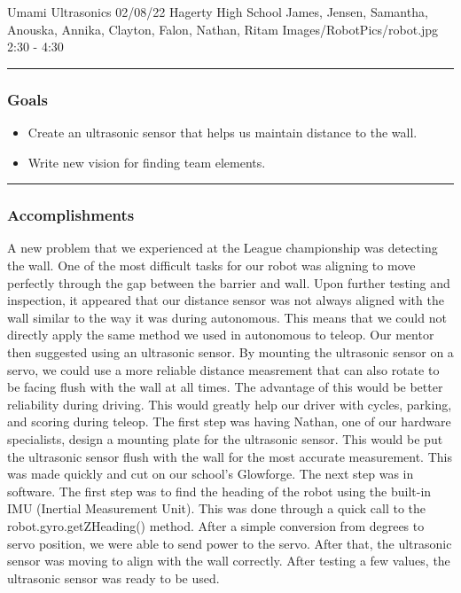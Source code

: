 \insertmeeting 
	{Umami Ultrasonics} 
	{02/08/22} 
	{Hagerty High School}
	{James, Jensen, Samantha, Anouska, Annika, Clayton, Falon, Nathan, Ritam}
	{Images/RobotPics/robot.jpg}
	{2:30 - 4:30}
	
\noindent\hfil\rule{\textwidth}{.4pt}\hfil
\subsubsection*{Goals}
\begin{itemize}
    \item Create an ultrasonic sensor that helps us maintain distance to the wall. 
    \item Write new vision for finding team elements.

\end{itemize} 

\noindent\hfil\rule{\textwidth}{.4pt}\hfil

\subsubsection*{Accomplishments}
A new problem that we experienced at the League championship was detecting the wall. One of the most difficult tasks for our robot was aligning to move perfectly through the gap between the barrier and wall. Upon further testing and inspection, it appeared that our distance sensor was not always aligned with the wall similar to the way it was during autonomous. This means that we could not directly apply the same method we used in autonomous to teleop. Our mentor then suggested using an ultrasonic sensor. By mounting the ultrasonic sensor on a servo, we could use a more reliable distance measrement that can also rotate to be facing flush with the wall at all times. The advantage of this would be better reliability during driving. This would greatly help our driver with cycles, parking, and scoring during teleop. 
The first step was having Nathan, one of our hardware specialists, design a mounting plate for the ultrasonic sensor. This would be put the ultrasonic sensor flush with the wall for the most accurate measurement. This was made quickly and cut on our school's Glowforge. 
The next step was in software. The first step was to find the heading of the robot using the built-in IMU (Inertial Measurement Unit). This was done through a quick call to the robot.gyro.getZHeading() method. After a simple conversion from degrees to servo position, we were able to send power to the servo. After that, the ultrasonic sensor was moving to align with the wall correctly. After testing a few values, the ultrasonic sensor was ready to be used. 

